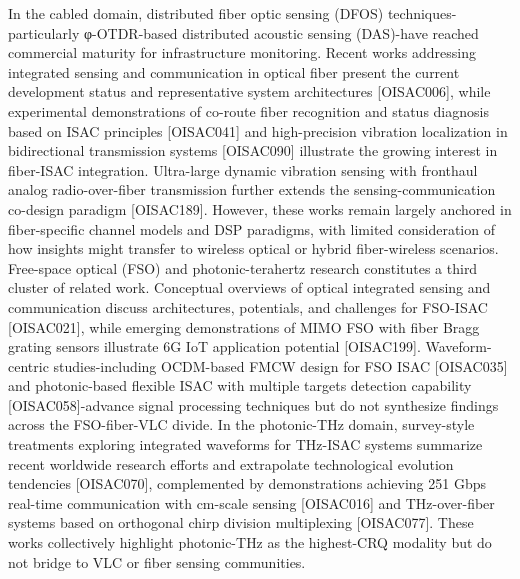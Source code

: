{} In the cabled domain, distributed fiber optic sensing (DFOS) techniques-particularly φ-OTDR-based distributed acoustic sensing (DAS)-have reached commercial maturity for infrastructure monitoring. Recent works addressing integrated sensing and communication in optical fiber present the current development status and representative system architectures [O\markdownRendererUnderscore{}ISAC\markdownRendererUnderscore{}006], while experimental demonstrations of co-route fiber recognition and status diagnosis based on ISAC principles [O\markdownRendererUnderscore{}ISAC\markdownRendererUnderscore{}041] and high-precision vibration localization in bidirectional transmission systems [O\markdownRendererUnderscore{}ISAC\markdownRendererUnderscore{}090] illustrate the growing interest in fiber-ISAC integration. Ultra-large dynamic vibration sensing with fronthaul analog radio-over-fiber transmission further extends the sensing-communication co-design paradigm [O\markdownRendererUnderscore{}ISAC\markdownRendererUnderscore{}189]. However, these works remain largely anchored in fiber-specific channel models and DSP paradigms, with limited consideration of how insights might transfer to wireless optical or hybrid fiber-wireless scenarios.\markdownRendererParagraphSeparator
{} Free-space optical (FSO) and photonic-terahertz research constitutes a third cluster of related work. Conceptual overviews of optical integrated sensing and communication discuss architectures, potentials, and challenges for FSO-ISAC [O\markdownRendererUnderscore{}ISAC\markdownRendererUnderscore{}021], while emerging demonstrations of MIMO FSO with fiber Bragg grating sensors illustrate 6G IoT application potential [O\markdownRendererUnderscore{}ISAC\markdownRendererUnderscore{}199]. Waveform-centric studies-including OCDM-based FMCW design for FSO ISAC [O\markdownRendererUnderscore{}ISAC\markdownRendererUnderscore{}035] and photonic-based flexible ISAC with multiple targets detection capability [O\markdownRendererUnderscore{}ISAC\markdownRendererUnderscore{}058]-advance signal processing techniques but do not synthesize findings across the FSO-fiber-VLC divide. In the photonic-THz domain, survey-style treatments exploring integrated waveforms for THz-ISAC systems summarize recent worldwide research efforts and extrapolate technological evolution tendencies [O\markdownRendererUnderscore{}ISAC\markdownRendererUnderscore{}070], complemented by demonstrations achieving 251 Gbps real-time communication with cm-scale sensing [O\markdownRendererUnderscore{}ISAC\markdownRendererUnderscore{}016] and THz-over-fiber systems based on orthogonal chirp division multiplexing [O\markdownRendererUnderscore{}ISAC\markdownRendererUnderscore{}077]. These works collectively highlight photonic-THz as the highest-CRQ\markdownRendererInlineMath{_{\Delta}} modality but do not bridge to VLC or fiber sensing communities.\markdownRendererParagraphSeparator
